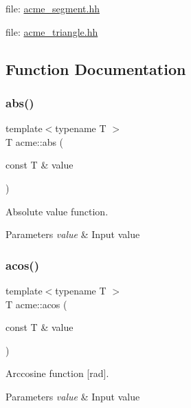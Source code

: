 file\+: \hyperlink{acme__segment_8hh_source}{acme\+\_\+segment.\+hh}

file\+: \hyperlink{acme__triangle_8hh_source}{acme\+\_\+triangle.\+hh} 

\subsection{Function Documentation}
\mbox{\label{namespaceacme_add7b88267b101300f6818a0ed6dacf2a}} 
\subsubsection{\texorpdfstring{abs()}{abs()}}
{\footnotesize\ttfamily template$<$typename T $>$ \\
T acme\+::abs (\begin{DoxyParamCaption}\item[{const T \&}]{value }\end{DoxyParamCaption})\hspace{0.3cm}{\ttfamily [inline]}}



Absolute value function. 


\begin{DoxyParams}{Parameters}
{\em value} & Input value \\
\hline
\end{DoxyParams}
\mbox{\label{namespaceacme_a9ea04b104383cbb01ba4b6bc8fbd1823}} 
\subsubsection{\texorpdfstring{acos()}{acos()}}
{\footnotesize\ttfamily template$<$typename T $>$ \\
T acme\+::acos (\begin{DoxyParamCaption}\item[{const T \&}]{value }\end{DoxyParamCaption})\hspace{0.3cm}{\ttfamily [inline]}}



Arccosine function \mbox{[}rad\mbox{]}. 


\begin{DoxyParams}{Parameters}
{\em value} & Input value \\
\hline
\end{DoxyParams}
\mbox{\label{namespaceacme_a8c712ed5d1336fab688be5cd7c6afd07}} 
